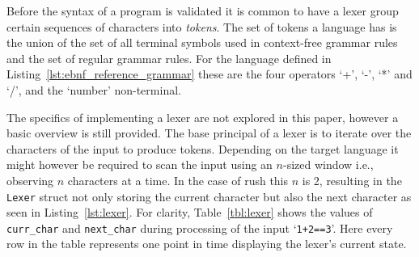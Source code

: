 Before the syntax of a program is validated it is common to have a lexer group certain sequences of characters into \emph{tokens}.
The set of tokens a language has is the union of the set of all terminal symbols used in context-free grammar rules and the set of regular grammar rules.
For the language defined in Listing~\ref{lst:ebnf_reference_grammar} these are the four operators `+', `-', `*' and `/', and the `number' non-terminal.

The specifics of implementing a lexer are not explored in this paper, however a basic overview is still provided.
The base principal of a lexer is to iterate over the characters of the input to produce tokens.
Depending on the target language it might however be required to scan the input using an $n$-sized window i.e., observing $n$ characters at a time.
In the case of rush this $n$ is 2, resulting in the \Verb|Lexer| struct not only storing the current character but also the next character as seen in Listing~\ref{lst:lexer}.
For clarity, Table~\ref{tbl:lexer} shows the values of \Verb|curr_char| and \Verb|next_char| during processing of the input `\Verb|1+2==3|'.
Here every row in the table represents one point in time displaying the lexer's current state.


